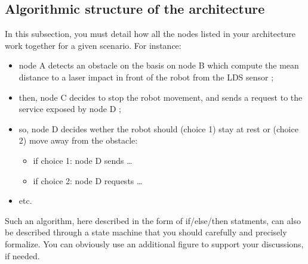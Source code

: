 \documentclass[conference]{IEEEtran}
\begin{document}
\subsection{Algorithmic structure of the architecture}
In this subsection, you must detail how all the nodes listed in your architecture work together
for a given scenario. For instance:
\begin{itemize}
    \item node A detects an obstacle on the basis on node B which compute the mean distance to a
          laser impact in front of the robot from the LDS sensor ;
    \item then, node C decides to stop the robot movement, and sends a request to the service
          exposed by node D ;
    \item so, node D decides wether the robot should (choice 1) stay at rest or (choice 2) move away
          from the obstacle:
          \begin{itemize}
              \item if choice 1: node D sends \ldots
              \item if choice 2: node D requests \ldots
          \end{itemize}
    \item etc.
\end{itemize}
%
Such an algorithm, here described in the form of if/else/then statments, can also be described
through a state machine that you should carefully and precisely formalize. You can obviously use an
additional figure to support your discussions, if needed.
\end{document}
